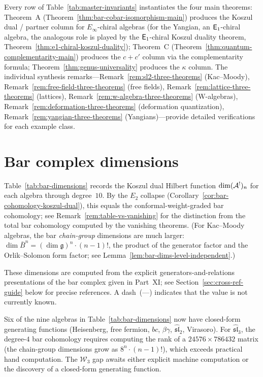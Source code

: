 Every row of Table~\ref{tab:master-invariants} instantiates the four main
theorems:
Theorem~A (Theorem~\ref{thm:bar-cobar-isomorphism-main}) produces the
Koszul dual / partner column for $E_\infty$-chiral algebras (for the
Yangian, an $\mathsf{E}_1$-chiral algebra, the analogous role is played by
the $\mathsf{E}_1$-chiral Koszul duality theorem,
Theorem~\ref{thm:e1-chiral-koszul-duality});
Theorem~C (Theorem~\ref{thm:quantum-complementarity-main}) produces the
$c + c'$ column via the complementarity formula;
Theorem~\ref{thm:genus-universality} produces the $\kappa$ column.
The individual synthesis remarks---Remark~\ref{rem:sl2-three-theorems}
(Kac--Moody), Remark~\ref{rem:free-field-three-theorems} (free fields),
Remark~\ref{rem:lattice-three-theorems} (lattices),
Remark~\ref{rem:w-algebra-three-theorems} (W-algebras),
Remark~\ref{rem:deformation-three-theorems} (deformation quantization),
Remark~\ref{rem:yangian-three-theorems} (Yangians)---provide
detailed verifications for each example class.


\section*{Bar complex dimensions}
\label{sec:bar-dimensions}

Table~\ref{tab:bar-dimensions} records the Koszul dual Hilbert
function $\dim (\mathcal{A}^!)_n$ for each algebra through degree~$10$.
By the $E_2$ collapse (Corollary~\ref{cor:bar-cohomology-koszul-dual}),
this equals the conformal-weight-graded bar cohomology; see
Remark~\ref{rem:table-vs-vanishing} for the distinction from the
total bar cohomology computed by the vanishing theorems.
(For Kac--Moody algebras, the bar \emph{chain-group} dimensions are much
larger: $\dim \bar{B}^n = (\dim\mathfrak{g})^n \cdot (n{-}1)!$,
the product of the generator factor and the Orlik--Solomon form
factor; see Lemma~\ref{lem:bar-dims-level-independent}.)

These dimensions are computed from the explicit
generators-and-relations
presentations of the bar complex given in Part~XI;
see Section~\ref{sec:cross-ref-guide} below for precise references.
A dash~(---) indicates that the value is not currently known.

Six of the nine algebras in Table~\ref{tab:bar-dimensions} now have
closed-form generating functions (Heisenberg, free fermion, $bc$,
$\beta\gamma$, $\widehat{\mathfrak{sl}}_2$, Virasoro).
For $\widehat{\mathfrak{sl}}_3$, the degree-$4$ bar cohomology
requires computing the rank of a $24576 \times 786432$ matrix
(the chain-group dimensions grow as $8^n \cdot (n{-}1)!$),
which exceeds practical hand computation.  The $\mathcal{W}_3$ gap awaits either explicit machine
computation or the discovery of a closed-form generating function.

